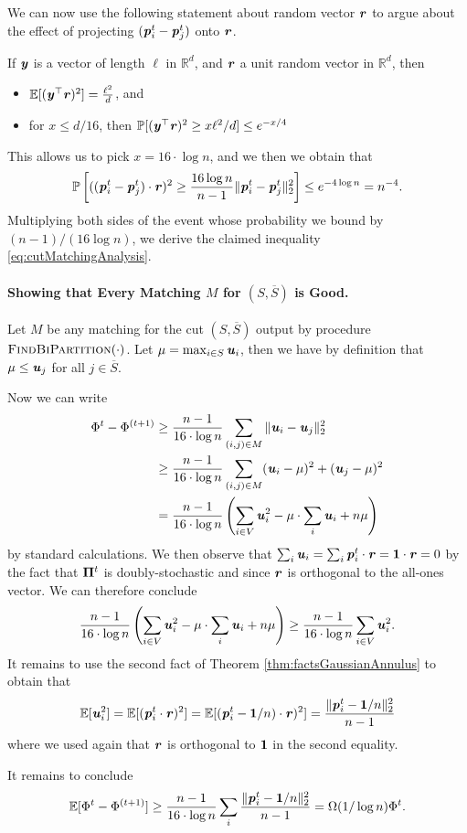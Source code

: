 We can now use the following statement about random vector $\boldsymbol{\mathit{r}}$ to argue about the effect of projecting $(\boldsymbol{\mathit{p}}_i^t - \boldsymbol{\mathit{p}}_j^t)$ onto $\boldsymbol{\mathit{r}}$. 

\begin{theorem}\label{thm:factsGaussianAnnulus}
If $\boldsymbol{\mathit{y}}$ is a vector of length $\ell$ in $\mathbb{R}^d$, and $\boldsymbol{\mathit{r}}$ a unit random vector in $\mathbb{R}^d$, then
\begin{itemize}
    \item $\mathbb{E}[(\boldsymbol{\mathit{y}}^\top \boldsymbol{\mathit{r}})^2] = \frac{\ell^2}{d}$, and
    \item for $x \leq d/16$, then $\mathbb{P}[(\boldsymbol{\mathit{y}}^\top \boldsymbol{\mathit{r}})^2 \geq x\ell^2/d] \leq e^{-x/4}$
\end{itemize}
\end{theorem}

This allows us to pick $x = 16 \cdot \log n$, and we then we obtain that
\[
    \mathbb{P}\left[ ((\boldsymbol{\mathit{p}}_i^t - \boldsymbol{\mathit{p}}_j^t) \cdot \boldsymbol{\mathit{r}})^2 \geq  \frac{16 \log n}{n-1} \|\boldsymbol{\mathit{p}}_i^t - \boldsymbol{\mathit{p}}_j^t\|_2^2\right] \leq e^{-4 \log n} = n^{-4}.
\]
Multiplying both sides of the event whose probability we bound by $(n-1)/(16 \log n)$, we derive the claimed inequality  \ref{eq:cutMatchingAnalysis}.

\paragraph{Showing that Every Matching $M$ for $(S, \overline{S})$ is Good.} Let $M$ be any matching for the cut $(S, \overline{S})$ output by procedure $\textsc{FindBiPartition}(\cdot)$. Let $\mu = \max_{i \in S} \boldsymbol{\mathit{u}}_i$, then we have by definition that $\mu \leq \boldsymbol{\mathit{u}}_j$ for all $j \in \overline{S}$.

Now we can write 
\begin{align*}
     \Phi^{t} - \Phi^{(t+1)} &\geq \frac{n-1}{16 \cdot \log n} \sum_{(i,j) \in M} \|\boldsymbol{\mathit{u}}_i - \boldsymbol{\mathit{u}}_j\|^2_2 \\
     &\geq  \frac{n-1}{16 \cdot \log n} \sum_{(i,j) \in M}  (\boldsymbol{\mathit{u}}_i - \mu)^2 + (\boldsymbol{\mathit{u}}_j - \mu)^2\\
     &=  \frac{n-1}{16 \cdot \log n}\left( \sum_{i \in V} \boldsymbol{\mathit{u}}_i^2 - \mu \cdot \sum_i \boldsymbol{\mathit{u}}_i + n \mu \right)
\end{align*}
by standard calculations. We then observe that $\sum_i \boldsymbol{\mathit{u}}_i = \sum_i \boldsymbol{\mathit{p}}_i^t \cdot \boldsymbol{\mathit{r}} = \boldsymbol{1} \cdot \boldsymbol{\mathit{r}} = 0$ by the fact that $\boldsymbol{\Pi}^t$ is doubly-stochastic and since $\boldsymbol{\mathit{r}}$ is orthogonal to the all-ones vector. We can therefore conclude 
\[
\frac{n-1}{16 \cdot \log n}\left( \sum_{i \in V} \boldsymbol{\mathit{u}}_i^2 - \mu \cdot \sum_i \boldsymbol{\mathit{u}}_i + n \mu \right) \geq \frac{n-1}{16 \cdot \log n} \sum_{i \in V} \boldsymbol{\mathit{u}}_i^2.
\]
It remains to use the second fact of Theorem \ref{thm:factsGaussianAnnulus} to obtain that 
\[
\mathbb{E}[\boldsymbol{\mathit{u}}_i^2] = \mathbb{E}[(\boldsymbol{\mathit{p}}_i^t \cdot \boldsymbol{\mathit{r}})^2] = \mathbb{E}[(\boldsymbol{\mathit{p}}_i^t - \boldsymbol{1}/n) \cdot \boldsymbol{\mathit{r}})^2] = \frac{\|\boldsymbol{\mathit{p}}_i^t - \boldsymbol{1}/n\|_2^2}{n-1}
\]
where we used again that $\boldsymbol{\mathit{r}}$ is orthogonal to $\boldsymbol{1}$ in the second equality.

It remains to conclude 
\[
\mathbb{E}[\Phi^{t} - \Phi^{(t+1)}] \geq \frac{n-1}{16 \cdot \log n} \sum_{i} \frac{\|\boldsymbol{\mathit{p}}_i^t - \boldsymbol{1}/n\|_2^2}{n-1} = \Omega(1/\log n) \Phi^t.
\]